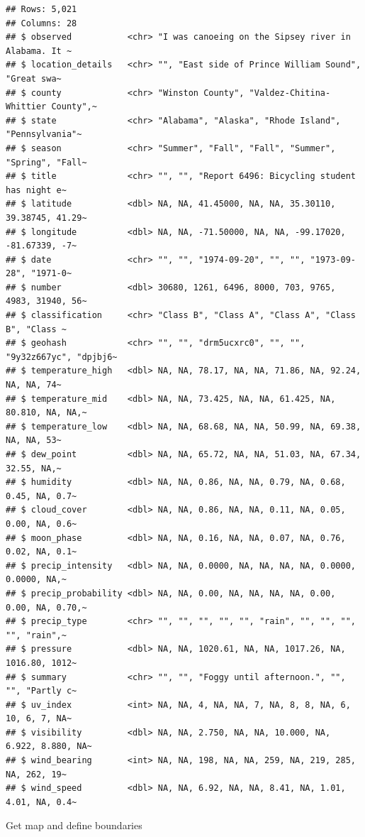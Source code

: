 \documentclass[
]{article}
\begin{document}
\begin{verbatim}
## Rows: 5,021
## Columns: 28
## $ observed           <chr> "I was canoeing on the Sipsey river in Alabama. It ~
## $ location_details   <chr> "", "East side of Prince William Sound", "Great swa~
## $ county             <chr> "Winston County", "Valdez-Chitina-Whittier County",~
## $ state              <chr> "Alabama", "Alaska", "Rhode Island", "Pennsylvania"~
## $ season             <chr> "Summer", "Fall", "Fall", "Summer", "Spring", "Fall~
## $ title              <chr> "", "", "Report 6496: Bicycling student has night e~
## $ latitude           <dbl> NA, NA, 41.45000, NA, NA, 35.30110, 39.38745, 41.29~
## $ longitude          <dbl> NA, NA, -71.50000, NA, NA, -99.17020, -81.67339, -7~
## $ date               <chr> "", "", "1974-09-20", "", "", "1973-09-28", "1971-0~
## $ number             <dbl> 30680, 1261, 6496, 8000, 703, 9765, 4983, 31940, 56~
## $ classification     <chr> "Class B", "Class A", "Class A", "Class B", "Class ~
## $ geohash            <chr> "", "", "drm5ucxrc0", "", "", "9y32z667yc", "dpjbj6~
## $ temperature_high   <dbl> NA, NA, 78.17, NA, NA, 71.86, NA, 92.24, NA, NA, 74~
## $ temperature_mid    <dbl> NA, NA, 73.425, NA, NA, 61.425, NA, 80.810, NA, NA,~
## $ temperature_low    <dbl> NA, NA, 68.68, NA, NA, 50.99, NA, 69.38, NA, NA, 53~
## $ dew_point          <dbl> NA, NA, 65.72, NA, NA, 51.03, NA, 67.34, 32.55, NA,~
## $ humidity           <dbl> NA, NA, 0.86, NA, NA, 0.79, NA, 0.68, 0.45, NA, 0.7~
## $ cloud_cover        <dbl> NA, NA, 0.86, NA, NA, 0.11, NA, 0.05, 0.00, NA, 0.6~
## $ moon_phase         <dbl> NA, NA, 0.16, NA, NA, 0.07, NA, 0.76, 0.02, NA, 0.1~
## $ precip_intensity   <dbl> NA, NA, 0.0000, NA, NA, NA, NA, 0.0000, 0.0000, NA,~
## $ precip_probability <dbl> NA, NA, 0.00, NA, NA, NA, NA, 0.00, 0.00, NA, 0.70,~
## $ precip_type        <chr> "", "", "", "", "", "rain", "", "", "", "", "rain",~
## $ pressure           <dbl> NA, NA, 1020.61, NA, NA, 1017.26, NA, 1016.80, 1012~
## $ summary            <chr> "", "", "Foggy until afternoon.", "", "", "Partly c~
## $ uv_index           <int> NA, NA, 4, NA, NA, 7, NA, 8, 8, NA, 6, 10, 6, 7, NA~
## $ visibility         <dbl> NA, NA, 2.750, NA, NA, 10.000, NA, 6.922, 8.880, NA~
## $ wind_bearing       <int> NA, NA, 198, NA, NA, 259, NA, 219, 285, NA, 262, 19~
## $ wind_speed         <dbl> NA, NA, 6.92, NA, NA, 8.41, NA, 1.01, 4.01, NA, 0.4~
\end{verbatim}

Get map and define boundaries
\end{document}
